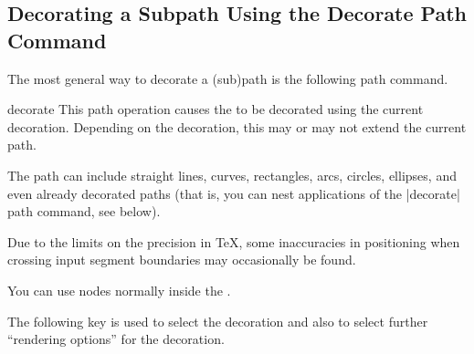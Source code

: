 \subsection{Decorating a Subpath Using the Decorate Path Command}

The most general way to decorate a (sub)path is the following path command.

\begin{pathoperation}{decorate}{}
    This path operation causes the  to be decorated using the
    current decoration. Depending on the decoration, this may or may not extend
    the current path.
\begin{codeexample}[preamble={\usetikzlibrary{decorations.pathmorphing}}]
\end{codeexample}
    The path can include straight lines, curves, rectangles, arcs, circles,
    ellipses, and even already decorated paths (that is, you can nest
    applications of the |decorate| path command, see below).

    Due to the limits on the precision in  \TeX, some inaccuracies in
    positioning when crossing input segment boundaries may occasionally be
    found.

    You can use nodes normally inside the .
\begin{codeexample}[preamble={\usetikzlibrary{
    decorations.pathmorphing,
    decorations.shapes,
}}]
\end{codeexample}

    The following key is used to select the decoration and also to select
    further ``rendering options'' for the decoration.


\end{pathoperation}
